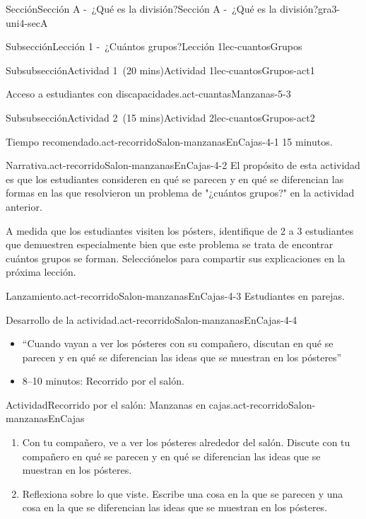 \documentclass[oneside,10pt,]{article}
\begin{document}
\begin{sectionptx}{Sección}{Sección A -~¿Qué es la división?}{}{Sección A -~¿Qué es la división?}{}{}{gra3-uni4-secA}
\begin{subsectionptx}{Subsección}{Lección 1 -~¿Cuántos grupos?}{}{Lección 1}{}{}{lec-cuantosGrupos}
\begin{subsubsectionptx}{Subsubsección}{Actividad 1~(20 mins)}{}{Actividad 1}{}{}{lec-cuantosGrupos-act1}
\begin{paragraphs}{Acceso a estudiantes con discapacidades.}{act-cuantasManzanas-5-3}
\end{paragraphs}%
\end{subsubsectionptx}
%
%
\typeout{************************************************}
\typeout{************************************************}
%
\begin{subsubsectionptx}{Subsubsección}{Actividad 2~(15 mins)}{}{Actividad 2}{}{}{lec-cuantosGrupos-act2}
\par
\begin{paragraphs}{Tiempo recomendado.}{act-recorridoSalon-manzanasEnCajas-4-1}%
15 minutos.%
\end{paragraphs}%
\begin{paragraphs}{Narrativa.}{act-recorridoSalon-manzanasEnCajas-4-2}%
El propósito de esta actividad es que los estudiantes consideren en qué se parecen y en qué se diferencian las formas en las que resolvieron un problema de "¿cuántos grupos?" en la actividad anterior.%
\par
A medida que los estudiantes visiten los pósters, identifique de 2 a 3 estudiantes que demuestren especialmente bien que este problema se trata de encontrar cuántos grupos se forman. Selecciónelos para compartir sus explicaciones en la próxima lección.%
\end{paragraphs}%
\begin{paragraphs}{Lanzamiento.}{act-recorridoSalon-manzanasEnCajas-4-3}%
Estudiantes en parejas.\end{paragraphs}%
\begin{paragraphs}{Desarrollo de la actividad.}{act-recorridoSalon-manzanasEnCajas-4-4}%
%
\begin{itemize}[label=\textbullet]
\item{}``Cuando vayan a ver los pósteres con su compañero, discutan en qué se parecen y en qué se diferencian las ideas que se muestran en los pósteres''%
\item{}8–10 minutos: Recorrido por el salón.%
\end{itemize}
\end{paragraphs}%
\begin{activity}{Actividad}{Recorrido por el salón: Manzanas en cajas.}{act-recorridoSalon-manzanasEnCajas}%
%
\begin{enumerate}
\item{}Con tu compañero, ve a ver los pósteres alrededor del salón. Discute con tu compañero en qué se parecen y en qué se diferencian las ideas que se muestran en los pósteres.%
\item{}Reflexiona sobre lo que viste. Escribe una cosa en la que se parecen y una cosa en la que se diferencian las ideas que se muestran en los pósteres.%

\end{enumerate}
\end{activity}
\end{subsubsectionptx}
\end{subsectionptx}
\end{sectionptx}
\end{document}
